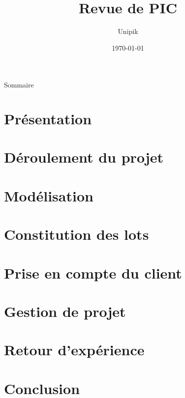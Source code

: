 \documentclass[compress,xcolor=dvipsnames]{beamer}
\title{Revue de PIC}
\date{\today}
\author{Unipik}
\institute{\insa}
\begin{document}
\speaker{\Pierre} 

\begin{frame}[plain]
	\titlepage
\end{frame}

\begin{frame}{Sommaire}
	\tableofcontents[hideallsubsections]
\end{frame}
 
\section[Présentation]{Présentation}


\section[Projet]{Déroulement du projet}


\section[Modélisation]{Modélisation}


\section[Lots]{Constitution des lots}


\section[Client]{Prise en compte du client}


\section[Gestion]{Gestion de projet}


\section[Retour]{Retour d'expérience}


\section[Conclusion]{Conclusion}

\end{document}
